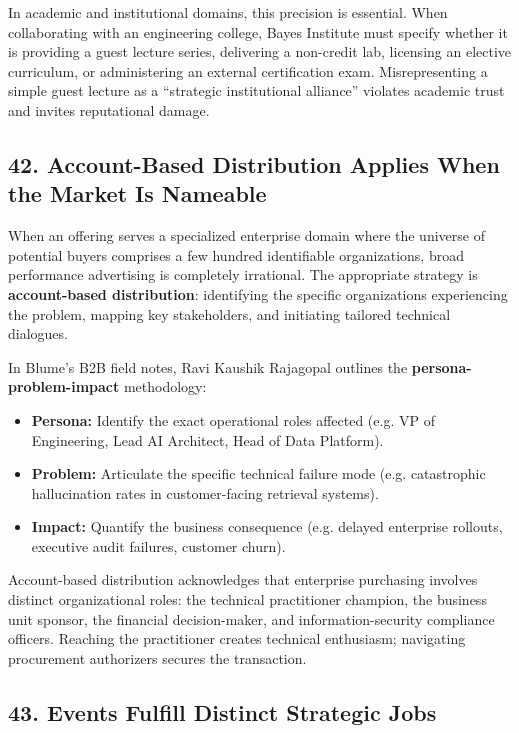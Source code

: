 In academic and institutional domains, this precision is essential. When collaborating with an engineering college, Bayes Institute must specify whether it is providing a guest lecture series, delivering a non-credit lab, licensing an elective curriculum, or administering an external certification exam. Misrepresenting a simple guest lecture as a ``strategic institutional alliance'' violates academic trust and invites reputational damage.

\subsection*{42. Account-Based Distribution Applies When the Market Is Nameable}

When an offering serves a specialized enterprise domain where the universe of potential buyers comprises a few hundred identifiable organizations, broad performance advertising is completely irrational. The appropriate strategy is \textbf{account-based distribution}: identifying the specific organizations experiencing the problem, mapping key stakeholders, and initiating tailored technical dialogues.

In Blume's B2B field notes, Ravi Kaushik Rajagopal outlines the \textbf{persona-problem-impact} methodology:
\begin{itemize}[leftmargin=*,itemsep=1pt]
  \item \textbf{Persona:} Identify the exact operational roles affected (e.g. VP of Engineering, Lead AI Architect, Head of Data Platform).
  \item \textbf{Problem:} Articulate the specific technical failure mode (e.g. catastrophic hallucination rates in customer-facing retrieval systems).
  \item \textbf{Impact:} Quantify the business consequence (e.g. delayed enterprise rollouts, executive audit failures, customer churn).
\end{itemize}

Account-based distribution acknowledges that enterprise purchasing involves distinct organizational roles: the technical practitioner champion, the business unit sponsor, the financial decision-maker, and information-security compliance officers. Reaching the practitioner creates technical enthusiasm; navigating procurement authorizers secures the transaction.

\subsection*{43. Events Fulfill Distinct Strategic Jobs}

